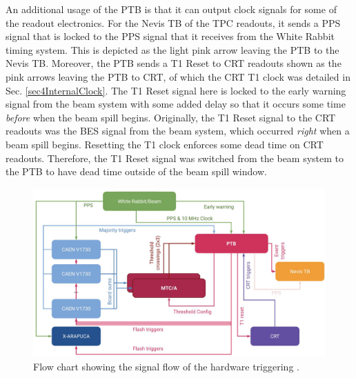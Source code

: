 An additional usage of the PTB is that it can output clock signals for some of the readout electronics.
For the Nevis TB of the TPC readouts, it sends a PPS signal that is locked to the PPS signal that it receives from the White Rabbit timing system.
This is depicted as the light pink arrow leaving the PTB to the Nevis TB.
Moreover, the PTB sends a T1 Reset to CRT readouts shown as the pink arrows leaving the PTB to CRT, of which the CRT T1 clock was detailed in Sec. \ref{sec4InternalClock}.
The T1 Reset signal here is locked to the early warning signal from the beam system with some added delay so that it occurs some time \textit{before} when the beam spill begins.
Originally, the T1 Reset signal to the CRT readouts was the BES signal from the beam system, which occurred \textit{right} when a beam spill begins.
Resetting the T1 clock enforces some dead time on CRT readouts.
Therefore, the T1 Reset signal was switched from the beam system to the PTB to have dead time outside of the beam spill window.  

\begin{figure}[hb!] 
\centering    
\includegraphics[width=1.0\textwidth]{SBND_Trigger}
\caption[Hardware Triggering Flow Chart]{
Flow chart showing the signal flow of the hardware triggering \cite{ptb_gvs}.
}
\label{fig:SBND_Trigger}
\end{figure}
